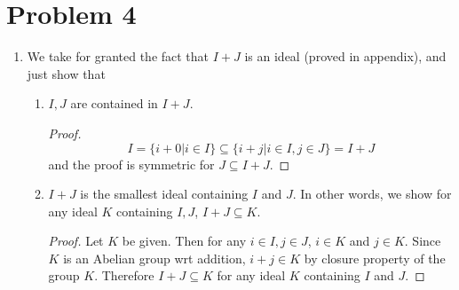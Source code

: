 \documentclass{article}
\theoremstyle{plain}
\begin{document}
\section*{Problem 4}
\begin{enumerate}
	\item We take for granted the fact that $I+J$ is an ideal (proved in
	      appendix), and just show that
	      \begin{enumerate}
		      \item $I,J$ are contained in $I+J$.
		            \begin{proof}
			            \[I=\{i+0|i\in I\}\subseteq\{i+j|i\in I, j\in J\}=I+J\] and the proof is symmetric
			            for $J\subseteq I+J$.
		            \end{proof}
		      \item $I+J$ is the smallest ideal containing $I$ and $J$.
		            In other words, we show for any ideal $K$ containing $I,J$,
		            $I+J\subseteq K$.
		            \begin{proof}
			            Let $K$ be given. Then for any $i\in I, j\in J$, $i\in K$ and $j\in K$.
			            Since $K$ is an Abelian group wrt addition, $i+j\in K$ by closure
			            property of the group $K$. Therefore $I+J\subseteq K$ for any ideal $K$
			            containing $I$ and $J$.
		            \end{proof}
	      \end{enumerate}



\end{enumerate}
\end{document}
